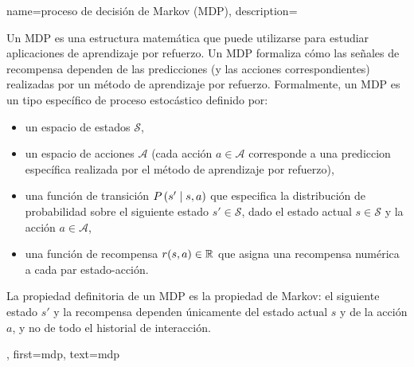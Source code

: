 		{name={proceso de decisión de Markov (MDP)},
		 description={
			Un MDP es una estructura matemática que puede 
			utilizarse para estudiar aplicaciones de aprendizaje por refuerzo. Un MDP formaliza cómo las señales de recompensa 
			dependen de las predicciones (y las acciones correspondientes) realizadas por un método de aprendizaje por refuerzo. 
			Formalmente, un MDP es un tipo específico de proceso estocástico definido por:
			\begin{itemize}
			\item un espacio de estados $\mathcal{S}$,
			\item un espacio de acciones $\mathcal{A}$ (cada acción $a \in \mathcal{A}$ corresponde a una 
				prediccion específica realizada por el método de aprendizaje por refuerzo),
			\item una función de transición $P\left(s' \mid s, a\right)$ que especifica la distribución de probabilidad sobre el 
				siguiente estado $s' \in \mathcal{S}$, dado el estado actual $s \in \mathcal{S}$ y la acción $a \in \mathcal{A}$,
			\item una función de recompensa $r(s, a) \in \mathbb{R}$ que asigna una recompensa numérica a cada 
				par estado-acción.
			\end{itemize}
			La propiedad definitoria de un MDP es la propiedad de Markov: el siguiente estado $s'$ y la recompensa
			dependen únicamente del estado actual $s$ y de la acción $a$, y no de todo el historial de interacción.
			},
		 first={mdp},
		 text={mdp} 
		}
		



